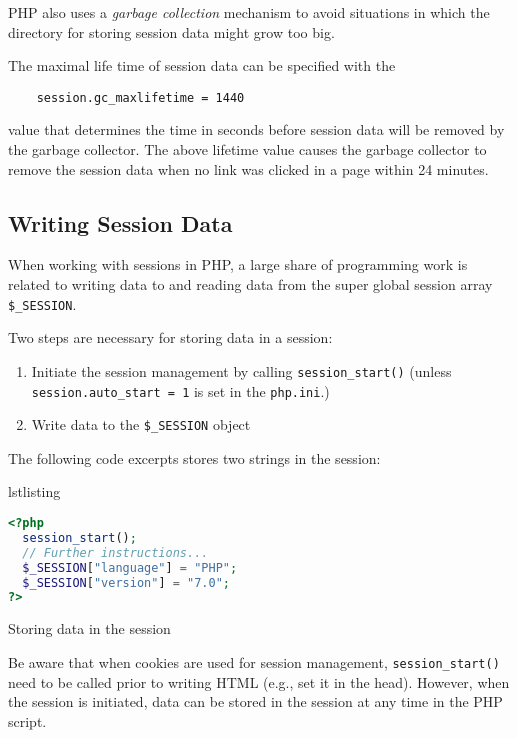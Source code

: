 \documentclass[a4paper, justified, notoc]{tufte-handout} %
\makeatletter
\newenvironment{listing}[1][htbp]
  {\ifvmode\else\unskip\fi\begin{@tufte@float}[#1]{lstlisting}{}}
  {\end{@tufte@float} } %
\makeatother
\begin{document}
PHP also uses a \emph{garbage collection} mechanism to avoid situations in which the directory for storing session data might grow too big. 

The maximal life time of session data can be specified with the 
\begin{Verbatim}
	session.gc_maxlifetime = 1440 
\end{Verbatim}
value that determines the time in seconds before session data will be removed by the garbage collector. 
The above lifetime value causes the garbage collector to remove the session data when no link was clicked in a page within 24 minutes.   

\subsection{Writing Session Data} %
\label{sub:writing_session_data}
When working with sessions in PHP, a large share of programming work is related to writing data to and reading data from the super global session array \texttt{\$\_SESSION}.

Two steps are necessary for storing data in a session:
\begin{enumerate}
	\item Initiate the session management by calling \texttt{session\_start()} \newline (unless \texttt{session.auto\_start = 1} is set in the \texttt{php.ini}.)
	\item Write data to the \texttt{\$\_SESSION} object
\end{enumerate}

The following code excerpts stores two strings in the session:
\begin{listing}
\begin{lstlisting}[language=PHP]
<?php
  session_start();
  // Further instructions...
  $_SESSION["language"] = "PHP";
  $_SESSION["version"] = "7.0";
?>
\end{lstlisting}
	\caption{Storing data in the session}
	\label{writing_session_data}
\end{listing}

Be aware that when cookies are used for session management, \texttt{session\_start()} need to be called prior to writing HTML (e.g., set it in the head). However, when the session is initiated, data can be stored in the session at any time in the PHP script.
\end{document}
